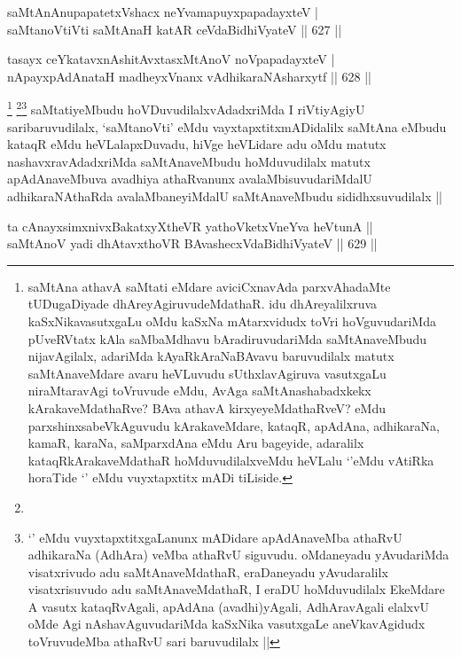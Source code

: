 \begin{shl}
saMtAnAnupapatetxVshacx neYvamapuyxpapadayxteV | \\
saMtanoVtiVti saMtAnaH katAR ceVdaBidhiVyateV \hfill||  627 ||  
\end{shl}
				
\begin{shl}
tasayx ceYkatavxnAshitAvxtasxMtAnoV noVpapadayxteV | \\
nApayxpAdAnataH madheyxVnanx vA\s dhikaraNAsharxytf \hfill||  628 ||  
\end{shl}

\begin{artha}
\footnote{saMtAna athavA saMtati eMdare aviciCxnavAda parxvAhadaMte tUDugaDiyade dhAreyAgiruvudeMdathaR. idu dhAreyalilxruva kaSxNikavasutxgaLu oMdu kaSxNa mAtarxvidudx toVri hoVguvudariMda pUveRVtatx kAla saMbaMdhavu bAradiruvudariMda saMtAnaveMbudu nijavAgilalx, adariMda kAyaRkAraNaBAvavu baruvudilalx matutx saMtAnaveMdare avaru heVLuvudu sUthxlavAgiruva vasutxgaLu niraMtaravAgi toVruvude eMdu, AvAga saMtAnashabadxkekx kArakaveMdathaRve? BAva athavA kirxyeyeMdathaRveV? eMdu parxshinxsabeVkAguvudu kArakaveMdare, kataqR, apAdAna, adhikaraNa, kamaR, karaNa, saMparxdAna eMdu Aru bageyide, adaralilx kataqRkArakaveMdathaR hoMduvudilalxveMdu heVLalu `\stext'eMdu vAtiRka horaTide `\stext' eMdu vuyxtapxtitx mADi tiLiside.}
\footnote{}\footnote{`\stext' eMdu vuyxtapxtitxgaLanunx mADidare apAdAnaveMba athaRvU adhikaraNa (AdhAra) veMba athaRvU siguvudu. oMdaneyadu yAvudariMda visatxrivudo adu saMtAnaveMdathaR, eraDaneyadu yAvudaralilx visatxrisuvudo adu saMtAnaveMdathaR, I eraDU hoMduvudilalx EkeMdare A vasutx kataqRvAgali, apAdAna (avadhi)yAgali, AdhAravAgali elalxvU oMde Agi nAshavAguvudariMda kaSxNika vasutxgaLe aneVkavAgidudx toVruvudeMba athaRvU sari baruvudilalx ||}
saMtatiyeMbudu hoVDuvudilalxvAdadxriMda I riVtiyAgiyU saribaruvudilalx, `saMtanoVti' eMdu vayxtapxtitxmADidalilx saMtAna eMbudu kataqR eMdu heVLalapxDuvadu, hiVge heVLidare adu oMdu matutx nashavxravAdadxriMda saMtAnaveMbudu hoMduvudilalx matutx apAdAnaveMbuva avadhiya athaRvanunx avalaMbisuvudariMdalU adhikaraNAthaRda avalaMbaneyiMdalU saMtAnaveMbudu sididhxsuvudilalx ||
\end{artha}


\begin{shl}
ta cAnayxsimxnivxBakatxyXtheVR yathoVketxVneYva heVtunA ||  \\
saMtAnoV yadi dhAtavxthoVR BAvashecxVdaBidhiVyateV \hfill||  629 ||  
\end{shl}

